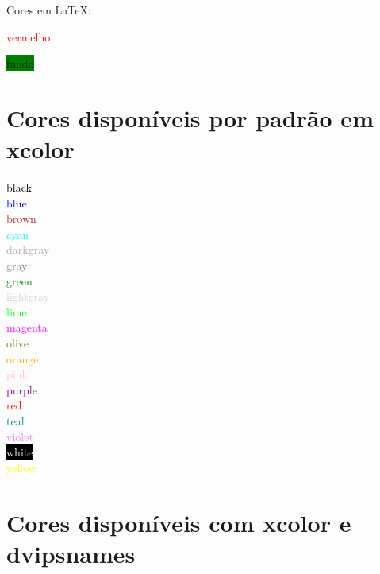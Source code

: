 \documentclass{article}
\begin{document}
	
Cores em LaTeX:	

\textcolor{red}{vermelho}

\colorbox{green}{fundo}

\pagecolor{minhacor}
	
\section{Cores disponíveis por padrão em xcolor}

\textcolor{black}{black}\\
\textcolor{blue}{blue}\\
\textcolor{brown}{brown}\\
\textcolor{cyan}{cyan}\\
\textcolor{darkgray}{darkgray}\\
\textcolor{gray}{gray}\\
\textcolor{green}{green}\\
\textcolor{lightgray}{lightgray}\\
\textcolor{lime}{lime}\\
\textcolor{magenta}{magenta}\\
\textcolor{olive}{olive}\\
\textcolor{orange}{orange}\\
\textcolor{pink}{pink}\\
\textcolor{purple}{purple}\\
\textcolor{red}{red}\\
\textcolor{teal}{teal}\\
\textcolor{violet}{violet}\\
\colorbox{black}{\textcolor{white}{white}}\\
\textcolor{yellow}{yellow}

\section{Cores disponíveis com xcolor e dvipsnames}
\end{document}
